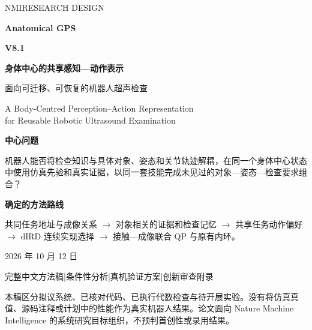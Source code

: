 \documentclass[UTF8,11pt,a4paper,fontset=fandol]{ctexart}
\numberwithin{equation}{section}
\theoremstyle{definition}
\begin{document}
\begin{titlepage}
\vspace*{10mm}
{\Large\color{teal}\sffamily NMI\quad RESEARCH DESIGN}\par
\vspace{12mm}
{\fontsize{32}{40}\selectfont\bfseries\color{ink}Anatomical GPS}\par
\vspace{3mm}
{\fontsize{24}{32}\selectfont\bfseries\color{ink}V8.1}\par
\vspace{10mm}
{\LARGE\bfseries 身体中心的共享感知—动作表示}\par
\vspace{4mm}
{\Large 面向可迁移、可恢复的机器人超声检查}\par
\vspace{8mm}
{\large\color{muted}A Body-Centred Perception--Action Representation\\
for Reusable Robotic Ultrasound Examination}\par
\vspace{12mm}
\begin{keybox}
\textbf{中心问题}\par
机器人能否将检查知识与具体对象、姿态和关节轨迹解耦，在同一个身体中心状态中使用仿真先验和真实证据，以同一套技能完成未见过的对象—姿态—检查要求组合？
\medskip\par
\textbf{确定的方法路线}\par
共同任务地址与成像关系 $\rightarrow$ 对象相关的证据和检查记忆 $\rightarrow$ 共享任务动作偏好 $\rightarrow$ dIRD 连续实现选择 $\rightarrow$ 接触—成像联合 QP 与原有内环。
\end{keybox}
\vfill
{\large 2026 年 10 月 12 日}\par
\vspace{3mm}
{\color{muted}完整中文方法稿\quad|\quad 条件性分析\quad|\quad 真机验证方案\quad|\quad 创新审查附录}\par
\vspace{5mm}
{\small 本稿区分拟议系统、已核对代码、已执行代数检查与待开展实验。没有将仿真真值、源码注释或计划中的性能作为真实机器人结果。论文面向 Nature Machine Intelligence 的系统研究目标组织，不预判首创性或录用结果。}
\end{titlepage}
\end{document}
